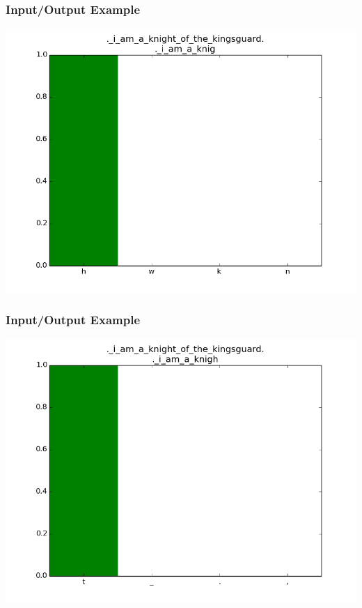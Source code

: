 \documentclass[12]{beamer}
\begin{document}
\begin{frame}
\frametitle{Input/Output Example}
\begin{center}
\includegraphics[scale=0.4]{../distplot/12.png}
\end{center}
\end{frame}

\begin{frame}
\frametitle{Input/Output Example}
\begin{center}
\includegraphics[scale=0.4]{../distplot/13.png}
\end{center}
\end{frame}
\end{document}
